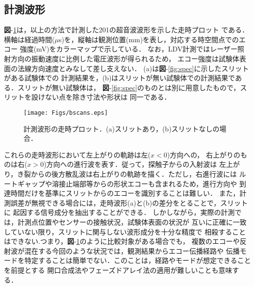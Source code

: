\subsection{計測波形}
{\bf 図}-\ref{fig:bscans}は，以上の方法で計測した201の超音波波形を示した走時プロット
である．横軸は経過時間($\mu$s)を，縦軸は観測位置(mm)を表し，対応する時空間点でのエコー
強度(mV)をカラーマップで示している．
%
なお，LDV計測ではレーザー照射方向の振動速度に比例した電圧波形が得られるため，
エコー強度は試験体表面の法線方向速度とみなして差し支えない．
%
(a)は{\bf 図}-\ref{fig:spec}に示したスリットがある試験体での
計測結果を，(b)はスリットが無い試験体での計測結果である．スリットが無い試験体は，
{\bf 図}-\ref{fig:spec}のものとは別に用意したもので，スリットを設けない点を除き寸法や形状は
同一である．
\begin{figure}[bht]
\centering
	\texttt{[image: Figs/bscans.eps]}
	\caption{計測波形の走時プロット．(a)スリットあり，(b)スリットなしの場合．}
	\label{fig:bscans}
\end{figure}
これらの走時波形において左上がりの軌跡は左($x<0$)方向への，
右上がりのものは右($x>0$)方向への進行波を表す．従って，探触子からの入射波は
左上がり，き裂からの後方散乱波は右上がりの軌跡を描く．ただし，右進行波には
ルートギャップや溶接止端部等からの形状エコーも含まれるため，進行方向や
到達時間だけを基準にスリットからのエコーを識別することは難しい．
%
また，計測誤差が無視できる場合には，走時波形(a)と(b)の差分をとることで，スリットに
起因する信号成分を抽出することができる．
%
しかしながら，実際の計測では，計測点位置やセンサーの接触状況，試験体表面の状況が
互いに正確に一致していない限り，スリットに関与しない波形成分を十分な精度で
相殺することはできない.つまり，{\bf 図}-\ref{fig:bscans}のように比較対象がある場合でも，
複数のエコーや反射波が混在する今回のような状況では，観測結果からエコー伝播経路や
伝播モードを特定することは簡単でない．このことは，経路やモードが想定できることを前提とする
開口合成法やフェーズドアレイ法の適用が難しいことも意味する．


